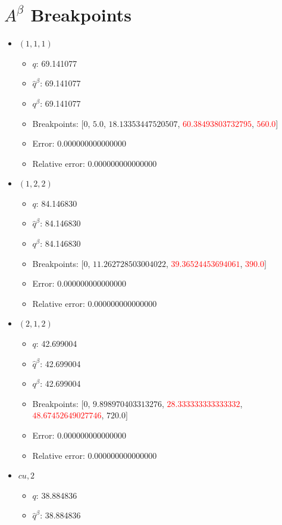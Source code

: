 \documentclass{article}%
\begin{document}
\section{$A^\beta$ Breakpoints}%
\thispagestyle{plain}%
\begin{itemize}%
	\item $(1, 1, 1)$%
	\begin{itemize}%
		\item $q$: 69.141077%
		\item $\hat{q}^\beta$: 69.141077%
		\item $q^\beta$: 69.141077%
		\item Breakpoints: $[$$0$, $5.0$, $18.13353447520507$, \textcolor{red}{$60.38493803732795$}, \textcolor{red}{$560.0$}$]$%
		\item Error: 0.000000000000000%
		\item Relative error: 0.000000000000000%
	\end{itemize}%
	\item $(1, 2, 2)$%
	\begin{itemize}%
		\item $q$: 84.146830%
		\item $\hat{q}^\beta$: 84.146830%
		\item $q^\beta$: 84.146830%
		\item Breakpoints: $[$$0$, $11.262728503004022$, \textcolor{red}{$39.36524453694061$}, \textcolor{red}{$390.0$}$]$%
		\item Error: 0.000000000000000%
		\item Relative error: 0.000000000000000%
	\end{itemize}%
	\item $(2, 1, 2)$%
	\begin{itemize}%
		\item $q$: 42.699004%
		\item $\hat{q}^\beta$: 42.699004%
		\item $q^\beta$: 42.699004%
		\item Breakpoints: $[$$0$, $9.898970403313276$, \textcolor{red}{$28.333333333333332$}, \textcolor{red}{$48.67452649027746$}, $720.0$$]$%
		\item Error: 0.000000000000000%
		\item Relative error: 0.000000000000000%
	\end{itemize}%
	\item $\textit{cu},2$%
	\begin{itemize}%
		\item $q$: 38.884836%
		\item $\hat{q}^\beta$: 38.884836%

\end{itemize}
\end{itemize}
\end{document}
